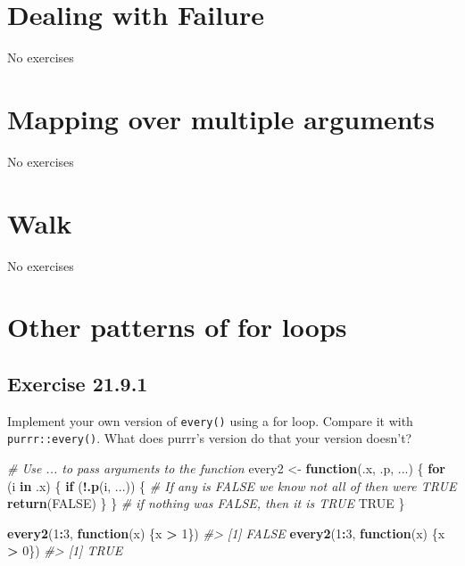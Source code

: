 \documentclass[]{book}
\newenvironment{Shaded}{\begin{snugshade}}{\end{snugshade}}
\newcommand{\CommentTok}[1]{\textcolor[rgb]{0.56,0.35,0.01}{\textit{#1}}}
\newcommand{\ControlFlowTok}[1]{\textcolor[rgb]{0.13,0.29,0.53}{\textbf{#1}}}
\newcommand{\DecValTok}[1]{\textcolor[rgb]{0.00,0.00,0.81}{#1}}
\newcommand{\KeywordTok}[1]{\textcolor[rgb]{0.13,0.29,0.53}{\textbf{#1}}}
\newcommand{\NormalTok}[1]{#1}
\newcommand{\OperatorTok}[1]{\textcolor[rgb]{0.81,0.36,0.00}{\textbf{#1}}}
\newcommand{\OtherTok}[1]{\textcolor[rgb]{0.56,0.35,0.01}{#1}}
\newcommand{\StringTok}[1]{\textcolor[rgb]{0.31,0.60,0.02}{#1}}
\theoremstyle{plain}
\theoremstyle{remark}
\theoremstyle{definition}
\theoremstyle{definition}
\theoremstyle{definition}
\theoremstyle{remark}
\begin{document}
\hypertarget{dealing-with-failure}{%
\section{Dealing with Failure}\label{dealing-with-failure}}

No exercises

\hypertarget{mapping-over-multiple-arguments}{%
\section{Mapping over multiple
arguments}\label{mapping-over-multiple-arguments}}

No exercises

\hypertarget{walk}{%
\section{Walk}\label{walk}}

No exercises

\hypertarget{other-patterns-of-for-loops}{%
\section{Other patterns of for
loops}\label{other-patterns-of-for-loops}}

\hypertarget{exercise-21.9.1}{%
\subsection*{\texorpdfstring{Exercise
{21.9.1}}{Exercise 21.9.1}}\label{exercise-21.9.1}}

Implement your own version of \texttt{every()} using a for loop. Compare
it with \texttt{purrr::every()}. What does purrr's version do that your
version doesn't?

\begin{Shaded}
\begin{Highlighting}[]
\CommentTok{# Use ... to pass arguments to the function}
\NormalTok{every2 <-}\StringTok{ }\ControlFlowTok{function}\NormalTok{(.x, .p, ...) \{}
  \ControlFlowTok{for}\NormalTok{ (i }\ControlFlowTok{in}\NormalTok{ .x) \{}
    \ControlFlowTok{if}\NormalTok{ (}\OperatorTok{!}\KeywordTok{.p}\NormalTok{(i, ...)) \{}
      \CommentTok{# If any is FALSE we know not all of then were TRUE}
      \KeywordTok{return}\NormalTok{(}\OtherTok{FALSE}\NormalTok{)}
\NormalTok{    \}}
\NormalTok{  \}}
  \CommentTok{# if nothing was FALSE, then it is TRUE}
  \OtherTok{TRUE}  
\NormalTok{\}}

\KeywordTok{every2}\NormalTok{(}\DecValTok{1}\OperatorTok{:}\DecValTok{3}\NormalTok{, }\ControlFlowTok{function}\NormalTok{(x) \{x }\OperatorTok{>}\StringTok{ }\DecValTok{1}\NormalTok{\})}
\CommentTok{#> [1] FALSE}
\KeywordTok{every2}\NormalTok{(}\DecValTok{1}\OperatorTok{:}\DecValTok{3}\NormalTok{, }\ControlFlowTok{function}\NormalTok{(x) \{x }\OperatorTok{>}\StringTok{ }\DecValTok{0}\NormalTok{\})}
\CommentTok{#> [1] TRUE}
\end{Highlighting}
\end{Shaded}
\end{document}
